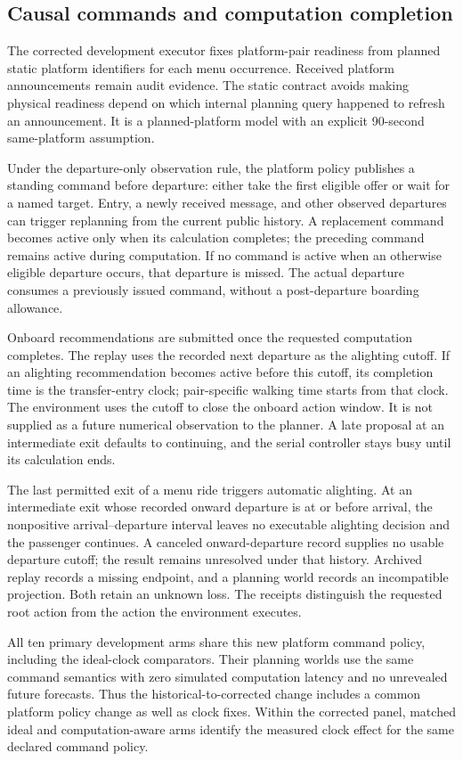 \subsection{Causal commands and computation completion}
The corrected development executor fixes platform-pair readiness from planned
static platform identifiers for each menu occurrence. Received platform
announcements remain audit evidence. The static contract avoids making physical
readiness depend on which internal planning query happened to refresh an
announcement. It is a planned-platform model with an explicit 90-second
same-platform assumption.

Under the departure-only observation rule, the platform policy publishes a
standing command before departure: either take the first eligible offer or
wait for a named target. Entry, a newly received message, and other observed
departures can trigger replanning from the current public history. A replacement
command becomes active only when its calculation completes; the preceding
command remains active during computation. If no command is active when an
otherwise eligible departure occurs, that departure is missed. The actual
departure consumes a previously issued command, without a post-departure
boarding allowance.

Onboard recommendations are submitted once the requested computation completes.
The replay uses the recorded next departure as the alighting cutoff. If an
alighting recommendation becomes active before this cutoff, its completion time
is the transfer-entry clock; pair-specific walking time starts from that clock.
The environment uses the cutoff to close the onboard action window. It is not supplied as a
future numerical observation to the planner. A late proposal at an intermediate
exit defaults to continuing, and the serial controller stays busy until its
calculation ends.

The last permitted exit of a menu ride triggers automatic alighting. At an
intermediate exit whose recorded onward departure is at or before arrival,
the nonpositive arrival--departure interval leaves no executable alighting
decision and the passenger continues. A canceled onward-departure record
supplies no usable departure cutoff; the
result remains unresolved under that history. Archived replay records a missing
endpoint, and a planning world records an incompatible projection. Both retain
an unknown loss. The receipts distinguish the requested root action from the
action the environment executes.

All ten primary development arms share this new platform command policy,
including the ideal-clock comparators. Their planning worlds use the same command
semantics with zero simulated computation latency and no unrevealed future
forecasts. Thus the historical-to-corrected change includes a common platform
policy change as well as clock fixes. Within the corrected panel, matched ideal
and computation-aware arms identify the measured clock effect for the same
declared command policy.

